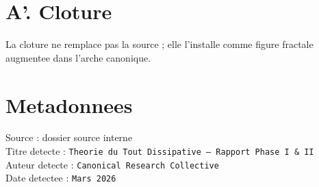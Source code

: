 ﻿\documentclass[11pt,a4paper]{article}
\begin{document}
\section*{A'. Cloture}
La cloture ne remplace pas la source ; elle l'installe comme figure fractale augmentee dans l'arche canonique.

\section*{Metadonnees}
Source : dossier source interne\\
Titre detecte : \texttt{Theorie du Tout Dissipative -- Rapport Phase I \& II}\\
Auteur detecte : \texttt{Canonical Research Collective}\\
Date detectee : \texttt{Mars 2026}
\end{document}
